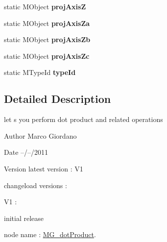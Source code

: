 \begin{DoxyCompactItemize}
\item 
\hypertarget{class_m_g__dot_product_a5ad0e70c95ace16eb4f32ebad26cce5b}{static M\-Object {\bfseries proj\-Axis\-Z}}\label{class_m_g__dot_product_a5ad0e70c95ace16eb4f32ebad26cce5b}

\item 
\hypertarget{class_m_g__dot_product_a34204c917132a4a65b31ef6ea48b4e17}{static M\-Object {\bfseries proj\-Axis\-Za}}\label{class_m_g__dot_product_a34204c917132a4a65b31ef6ea48b4e17}

\item 
\hypertarget{class_m_g__dot_product_a59e3cb3a26e111df26c6703e50611855}{static M\-Object {\bfseries proj\-Axis\-Zb}}\label{class_m_g__dot_product_a59e3cb3a26e111df26c6703e50611855}

\item 
\hypertarget{class_m_g__dot_product_aeaa3f9c5ccaf5bac58df112e2fe0eb57}{static M\-Object {\bfseries proj\-Axis\-Zc}}\label{class_m_g__dot_product_aeaa3f9c5ccaf5bac58df112e2fe0eb57}

\item 
\hypertarget{class_m_g__dot_product_afed6410b30e30348b411f3407934a5d7}{static M\-Type\-Id {\bfseries type\-Id}}\label{class_m_g__dot_product_afed6410b30e30348b411f3407934a5d7}

\end{DoxyCompactItemize}


\subsection{Detailed Description}
let s you perform dot product and related operations 

\begin{DoxyAuthor}{Author}
Marco Giordano 
\end{DoxyAuthor}
\begin{DoxyDate}{Date}
--/--/2011 
\end{DoxyDate}
\begin{DoxyVersion}{Version}
latest version \-: V1 

changeload versions \-: \par
 V1 \-: \par

\begin{DoxyItemize}
\item initial release \par

\end{DoxyItemize}
\end{DoxyVersion}
node name \-: \hyperlink{class_m_g__dot_product}{M\-G\-\_\-dot\-Product}.

